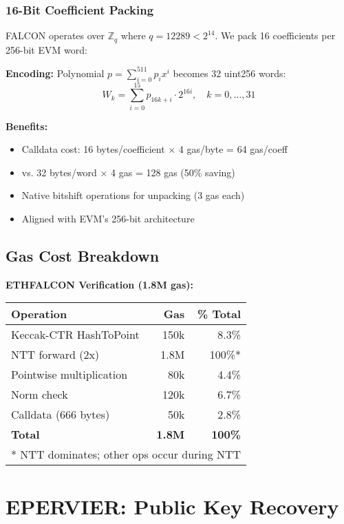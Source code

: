 \documentclass[11pt,a4paper]{article}
\begin{document}
\subsubsection{16-Bit Coefficient Packing}

FALCON operates over $\mathbb{Z}_q$ where $q = 12289 < 2^{14}$. We pack 16 coefficients per 256-bit EVM word:

\textbf{Encoding:} Polynomial $p = \sum_{i=0}^{511} p_i x^i$ becomes 32 uint256 words:
\begin{equation}
W_k = \sum_{i=0}^{15} p_{16k+i} \cdot 2^{16i}, \quad k = 0, \ldots, 31
\end{equation}

\textbf{Benefits:}
\begin{itemize}
    \item Calldata cost: 16 bytes/coefficient $\times$ 4 gas/byte = 64 gas/coeff
    \item vs. 32 bytes/word $\times$ 4 gas = 128 gas (50\% saving)
    \item Native bitshift operations for unpacking (3 gas each)
    \item Aligned with EVM's 256-bit architecture
\end{itemize}

\subsection{Gas Cost Breakdown}

\textbf{ETHFALCON Verification (1.8M gas):}
\begin{center}
\begin{tabular}{lrr}
\hline
\textbf{Operation} & \textbf{Gas} & \textbf{\% Total} \\
\hline
Keccak-CTR HashToPoint & 150k & 8.3\% \\
NTT forward (2x) & 1.8M & 100\%* \\
Pointwise multiplication & 80k & 4.4\% \\
Norm check & 120k & 6.7\% \\
Calldata (666 bytes) & 50k & 2.8\% \\
\hline
\textbf{Total} & \textbf{1.8M} & \textbf{100\%} \\
\hline
\multicolumn{3}{l}{* NTT dominates; other ops occur during NTT}
\end{tabular}
\end{center}

\section{EPERVIER: Public Key Recovery}
\end{document}
